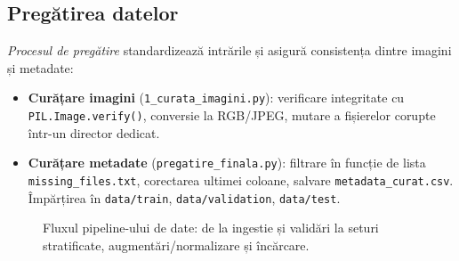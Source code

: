 \subsection{Pregătirea datelor}
\emph{Procesul de pregătire} standardizează intrările și asigură consistența dintre imagini și metadate:
\begin{itemize}
  \item \textbf{Curățare imagini} (\texttt{1\_curata\_imagini.py}): verificare integritate cu \texttt{PIL.Image.verify()}, conversie la RGB/JPEG, mutare a fișierelor corupte într-un director dedicat.
  \item \textbf{Curățare metadate} (\texttt{pregatire\_finala.py}): filtrare în funcție de lista \texttt{missing\_files.txt}, corectarea ultimei coloane, salvare \texttt{metadata\_curat.csv}. Împărțirea în \texttt{data/train}, \texttt{data/validation}, \texttt{data/test}.
\end{itemize}

\begin{figure}[!htbp]
  \centering
  \caption{Fluxul pipeline-ului de date: de la ingestie și validări la seturi stratificate, augmentări/normalizare și încărcare.}
  \label{fig:c5-data-pipeline}
\end{figure}

